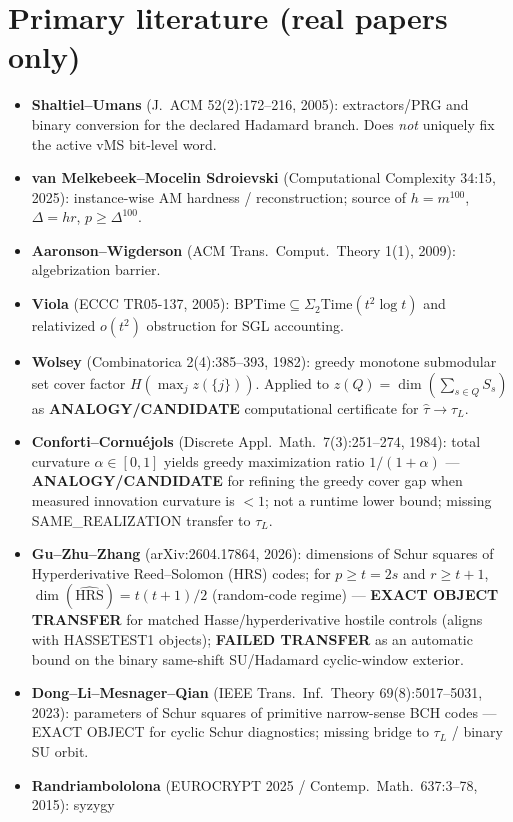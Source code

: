 \documentclass[11pt]{article}
\begin{document}
\section*{Primary literature (real papers only)}
\begin{itemize}
\item \textbf{Shaltiel--Umans} (J.~ACM 52(2):172--216, 2005): extractors/PRG and binary conversion
for the declared Hadamard branch. Does \emph{not} uniquely fix the active vMS bit-level word.
\item \textbf{van Melkebeek--Mocelin Sdroievski} (Computational Complexity 34:15, 2025): instance-wise
AM hardness / reconstruction; source of $h=m^{100}$, $\Delta=hr$, $p\ge\Delta^{100}$.
\item \textbf{Aaronson--Wigderson} (ACM Trans.\ Comput.\ Theory 1(1), 2009): algebrization barrier.
\item \textbf{Viola} (ECCC TR05-137, 2005): BPTime$\subseteq\Sigma_2$Time$(t^2\log t)$ and relativized
$o(t^2)$ obstruction for SGL accounting.
\item \textbf{Wolsey} (Combinatorica 2(4):385--393, 1982): greedy monotone submodular set cover
factor $H(\max_j z(\{j\}))$. Applied to $z(Q)=\dim(\sum_{s\in Q}S_s)$ as
\textbf{ANALOGY/CANDIDATE} computational certificate for $\widehat\tau\to\tau_L$.
\item \textbf{Conforti--Cornu\'ejols} (Discrete Appl.\ Math.\ 7(3):251--274, 1984): total curvature
$\alpha\in[0,1]$ yields greedy maximization ratio $1/(1+\alpha)$ ---
\textbf{ANALOGY/CANDIDATE} for refining the greedy cover gap when measured innovation curvature
is $<1$; not a runtime lower bound; missing SAME\_REALIZATION transfer to $\tau_L$.
\item \textbf{Gu--Zhu--Zhang} (arXiv:2604.17864, 2026): dimensions of Schur squares of Hyperderivative
Reed--Solomon (HRS) codes; for $p\ge t=2s$ and $r\ge t+1$, $\dim(\widehat{\mathrm{HRS}})=t(t+1)/2$
(random-code regime) --- \textbf{EXACT OBJECT TRANSFER} for matched Hasse/hyperderivative
hostile controls (aligns with HASSETEST1 objects); \textbf{FAILED TRANSFER} as an automatic
bound on the binary same-shift SU/Hadamard cyclic-window exterior.
\item \textbf{Dong--Li--Mesnager--Qian} (IEEE Trans.\ Inf.\ Theory 69(8):5017--5031, 2023):
parameters of Schur squares of primitive narrow-sense BCH codes --- EXACT OBJECT for cyclic
Schur diagnostics; missing bridge to $\tau_L$ / binary SU orbit.
\item \textbf{Randriambololona} (EUROCRYPT 2025 / Contemp.\ Math.\ 637:3--78, 2015): syzygy

\end{itemize}
\end{document}
